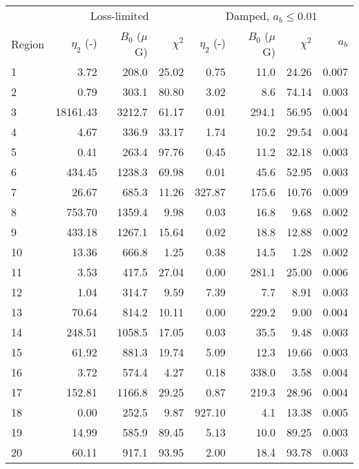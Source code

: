 \begin{tabular}{@{} l rrr rrrr @{}}
\toprule
{} & \multicolumn{3}{c}{Loss-limited}
   & \multicolumn{4}{c}{Damped, $a_b \leq 0.01$} \\
\cmidrule(lr){2-4} \cmidrule(l){5-8}
Region & $\eta_2$ (-) & $B_0$ ($\mu$G) & $\chi^2$
       & $\eta_2$ (-) & $B_0$ ($\mu$G) & $\chi^2$ & $a_b$ \\
\midrule
1 & 3.72 & 208.0 & 25.02 & 0.75 & 11.0 & 24.26 & 0.007 \\
2 & 0.79 & 303.1 & 80.80 & 3.02 & 8.6 & 74.14 & 0.003 \\
3 & 18161.43 & 3212.7 & 61.17 & 0.01 & 294.1 & 56.95 & 0.004 \\
\cmidrule{1-8}
4 & 4.67 & 336.9 & 33.17 & 1.74 & 10.2 & 29.54 & 0.004 \\
5 & 0.41 & 263.4 & 97.76 & 0.45 & 11.2 & 32.18 & 0.003 \\
6 & 434.45 & 1238.3 & 69.98 & 0.01 & 45.6 & 52.95 & 0.003 \\
7 & 26.67 & 685.3 & 11.26 & 327.87 & 175.6 & 10.76 & 0.009 \\
8 & 753.70 & 1359.4 & 9.98 & 0.03 & 16.8 & 9.68 & 0.002 \\
9 & 433.18 & 1267.1 & 15.64 & 0.02 & 18.8 & 12.88 & 0.002 \\
10 & 13.36 & 666.8 & 1.25 & 0.38 & 14.5 & 1.28 & 0.002 \\
\cmidrule{1-8}
11 & 3.53 & 417.5 & 27.04 & 0.00 & 281.1 & 25.00 & 0.006 \\
12 & 1.04 & 314.7 & 9.59 & 7.39 & 7.7 & 8.91 & 0.003 \\
13 & 70.64 & 814.2 & 10.11 & 0.00 & 229.2 & 9.00 & 0.004 \\
\cmidrule{1-8}
14 & 248.51 & 1058.5 & 17.05 & 0.03 & 35.5 & 9.48 & 0.003 \\
15 & 61.92 & 881.3 & 19.74 & 5.09 & 12.3 & 19.66 & 0.003 \\
16 & 3.72 & 574.4 & 4.27 & 0.18 & 338.0 & 3.58 & 0.004 \\
17 & 152.81 & 1166.8 & 29.25 & 0.87 & 219.3 & 28.96 & 0.004 \\
\cmidrule{1-8}
18 & 0.00 & 252.5 & 9.87 & 927.10 & 4.1 & 13.38 & 0.005 \\
19 & 14.99 & 585.9 & 89.45 & 5.13 & 10.0 & 89.25 & 0.003 \\
20 & 60.11 & 917.1 & 93.95 & 2.00 & 18.4 & 93.78 & 0.003 \\
\bottomrule
\end{tabular}


